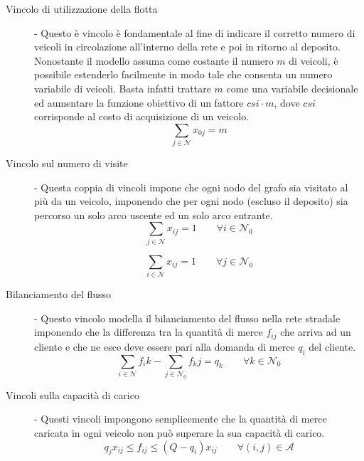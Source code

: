 		\begin{description}
			\item[Vincolo di utilizzazione della flotta]-
				Questo è vincolo è fondamentale al fine di indicare il corretto numero di veicoli in circolazione all’interno della rete e poi in ritorno al deposito. Nonostante il modello assuma come costante il numero $m$ di veicoli, è possibile estenderlo facilmente in modo tale che consenta un numero variabile di veicoli. Basta infatti trattare $m$ come una variabile decisionale ed aumentare la funzione obiettivo di un fattore $csi \cdot m$, dove $csi$ corrisponde al costo di acquisizione di un veicolo.
				\begin{equation}
					\label{eq:fleet_usage}
					\sum_{j \in \mathcal{N}} x_{0j} = m
				\end{equation}

			\item[Vincolo sul numero di visite]-
				Questa coppia di vincoli impone che 	ogni nodo del grafo sia visitato al più da un veicolo, imponendo che per ogni nodo (escluso il deposito) sia percorso un solo arco uscente ed un solo arco entrante.
				\begin{equation}
					\label{eq:single_exit}
					\sum_{j \in \mathcal{N}} x_{ij} = 1 
					\qquad 
					\forall i \in \mathcal{N}_0
				\end{equation}

				\begin{equation}
					\label{eq:single_entrance}
					\sum_{i \in \mathcal{N}} x_{ij} = 1 
					\qquad 
					\forall j \in \mathcal{N}_0
				\end{equation}

			\item[Bilanciamento del flusso]-
				Questo vincolo modella il bilanciamento del flusso nella rete stradale imponendo che la differenza tra la quantità di merce $f_{ij}$ che arriva ad un cliente e che ne esce deve essere pari alla domanda di merce $q_i$ del cliente.
				\begin{equation}
					\label{eq:flux_balance}
					\sum_{i \in \mathcal{N}}f_ik - \sum_{j \in \mathcal{N}_0}f_kj = q_k  
					\qquad
					\forall k \in \mathcal{N}_0
				\end{equation}

			\item[Vincoli sulla capacità di carico]-
				Questi vincoli impongono semplicemente che la quantità di merce caricata in ogni veicolo non può superare la sua capacità di carico.
				\begin{equation}
					\label{eq:capacity_constraint}
					q_j x_{ij} \leq f_{ij} \leq (Q - q_i)x_{ij} 
					\qquad
					\forall (i,j) \in \mathcal{A} 
				\end{equation}


\end{description}

